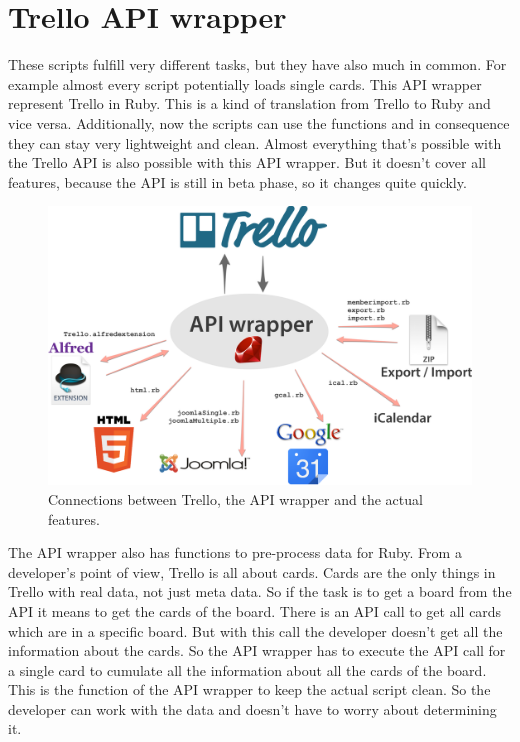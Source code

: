 \onehalfspacing
\chapter{Trello API wrapper}

These scripts fulfill very different tasks, but they have also much in common. For example almost every script potentially loads single cards. This API wrapper represent Trello in Ruby. This is a kind of translation from Trello to Ruby and vice versa. Additionally, now the scripts can use the functions and in consequence they can stay very lightweight and clean. Almost everything that's possible with the Trello API is also possible with this API wrapper. But it doesn't cover all features, because the API is still in beta phase, so it changes quite quickly.

\begin{figure}
\centering
\includegraphics[width=\textwidth]{figures/api-wrapper}
\caption{Connections between Trello, the API wrapper and the actual features. \cite{ruby:icon}\cite{html:logo}\cite{joomla}\cite{google} }
\label{fig: api-wrapper}
\end{figure}

The API wrapper also has functions to pre-process data for Ruby. From a developer's point of view, Trello is all about cards. Cards are the only things in Trello with real data, not just meta data. So if the task is to get a board from the API it means to get the cards of the board. There is an API call to get all cards which are in a specific board. But with this call the developer doesn't get all the information about the cards. So the API wrapper has to execute the API call for a single card to cumulate all the information about all the cards of the board. This is the function of the API wrapper to keep the actual script clean. So the developer can work with the data and doesn't have to worry about determining it.


